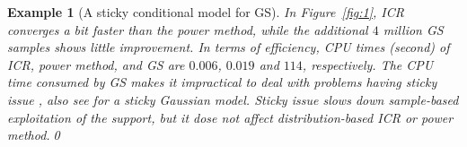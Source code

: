 \documentclass[12pt,a4paper]{article}
\newtheorem{example}{Example}
\begin{document}
\begin{example} [A sticky conditional model for GS]
In Figure~\ref{fig:1}, ICR converges a bit faster than the power method, while the additional
$4$ million GS samples shows little improvement.%
In terms of efficiency, CPU times (second) of ICR, power method, and GS
are $0.006$, $0.019$ and $114$, respectively.  The  CPU time consumed by
GS makes it impractical to deal with problems having sticky
issue \citep[p.~354]{Williams2001}, also see \citet[Example~5]{Kuo2018} for a sticky Gaussian model.
Sticky issue slows down sample-based exploitation of the support, but it dose not affect distribution-based ICR or power method.\qed
\end{example}
\end{document}
